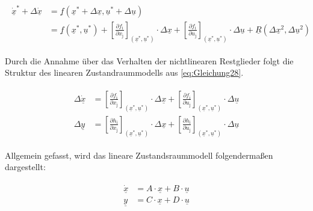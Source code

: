 \documentclass[
	pagesize,
	fontsize=12pt,
	paper=a4,
	oneside,
   reqno
]{scrartcl}
\begin{document}
\begin{align}\label{eq:Gleichung27}
    \begin{split}
        \dot{\underline{x}}^{*}+\Delta{\dot{\underline{x}}} &=\underline{f}(\underline{x}^{*}+\Delta{\underline{x}},\underline{u}^{*}+\Delta{\underline{u}})\\
        &=\underline{f}(\underline{x}^{*},\underline{u}^{*})+\left[\frac{\partial f_{\mathrm{i}}}{\partial x_{\mathrm{j}}}\right]_{(\underline{x}^{*}, \underline{u}^{*})}\cdot\Delta{\underline{x}}+\left[\frac{\partial f_{\mathrm{i}}}{\partial u_{\mathrm{j}}}\right]_{(\underline{x}^{*},\underline{u}^{*})}\cdot\Delta{\underline{u}}+\underline{R}(\Delta{\underline{x}^2}, \Delta{\underline{u}^2})
    \end{split}
\end{align}

Durch die Annahme über das Verhalten der nichtlinearen Restglieder folgt die Struktur des linearen Zustandraummodells aus \autoref{eq:Gleichung28}.

\begin{align}\label{eq:Gleichung28}
    \begin{split}
        \Delta\dot{\underline{x}} &= \left[\frac{\partial f_{\mathrm{i}}}{\partial x_{\mathrm{j}}}\right]_{(\underline{x}^{*}, \underline{u}^{*})}\cdot\Delta{\underline{x}}+\left[\frac{\partial f_{\mathrm{i}}}{\partial u_{\mathrm{j}}}\right]_{(\underline{x}^{*},\underline{u}^{*})}\cdot\Delta{\underline{u}}\\   
        \Delta{\underline{y}} &= \left[\frac{\partial h_{\mathrm{i}}}{\partial x_{\mathrm{j}}}\right]_{(\underline{x}^{*}, \underline{u}^{*})}\cdot\Delta{\underline{x}}+\left[\frac{\partial h_{\mathrm{i}}}{\partial u_{\mathrm{j}}}\right]_{(\underline{x}^{*},\underline{u}^{*})}\cdot\Delta{\underline{u}}
    \end{split}
\end{align}

 Allgemein gefasst, wird das lineare Zustandsraummodell folgendermaßen dargestellt:

\begin{align}\label{eq:Gleichung29}
    \begin{split}
        \dot{\underline{x}} &= A\cdot\underline{x}+B\cdot\underline{u}\\
        \underline{y} &= C\cdot\underline{x}+D\cdot\underline{u}
    \end{split}
\end{align}
\end{document}
